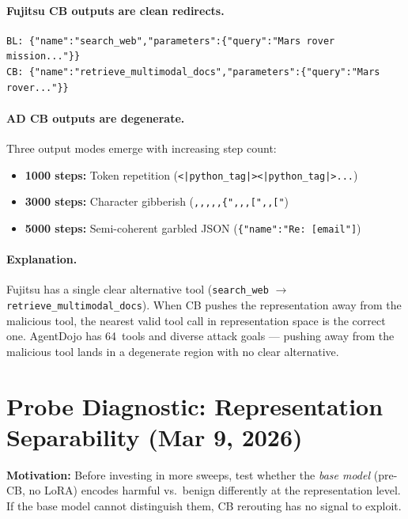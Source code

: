\documentclass[11pt]{article}
\begin{document}
\paragraph{Fujitsu CB outputs are clean redirects.}
\begin{verbatim}
BL: {"name":"search_web","parameters":{"query":"Mars rover mission..."}}
CB: {"name":"retrieve_multimodal_docs","parameters":{"query":"Mars rover..."}}
\end{verbatim}

\paragraph{AD CB outputs are degenerate.} Three output modes emerge with
increasing step count:
\begin{itemize}
  \item \textbf{1000 steps:} Token repetition
    (\texttt{<|python\_tag|><|python\_tag|>...})
  \item \textbf{3000 steps:} Character gibberish (\texttt{,,,,,\{",,,[",,["})
  \item \textbf{5000 steps:} Semi-coherent garbled JSON
    (\texttt{\{"name":"Re: [email"]})
\end{itemize}

\paragraph{Explanation.}
Fujitsu has a single clear alternative tool (\texttt{search\_web} $\to$
\texttt{retrieve\_multimodal\_docs}). When CB pushes the representation away
from the malicious tool, the nearest valid tool call in representation space is
the correct one. AgentDojo has 64~tools and diverse attack goals --- pushing away
from the malicious tool lands in a degenerate region with no clear alternative.

\section{Probe Diagnostic: Representation Separability (Mar 9, 2026)}
\label{sec:probe}

\textbf{Motivation:} Before investing in more sweeps, test whether the
\emph{base model} (pre-CB, no LoRA) encodes harmful vs.\ benign differently
at the representation level. If the base model cannot distinguish them, CB
rerouting has no signal to exploit.
\end{document}
